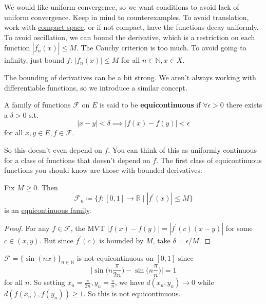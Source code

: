   We would like uniform convergence, so we want conditions to avoid lack of uniform convergence. Keep in mind to counterexamples. To avoid translation, work with \hyperref[pst-def:compact-space]{compact space}, or if not compact, have the functions decay uniformly. To avoid oscillation, we can bound the derivative, which is a restriction on each function $|f_n^\prime (x)| \leq M$. The Cauchy criterion is too much. To avoid going to infinity, just bound $f$: $|f_n (x)| \leq M$ for all $n \in \mathbb{N}, x \in X$. 

  The bounding of derivatives can be a bit strong. We aren't always working with differentiable functions, so we introduce a similar concept. 

  \begin{definition}
    \label{def:equicontinuous-family}
    A family of functions $\mathcal{F}$ on $E$ is said to be \textbf{equicontinuous} if $\forall \epsilon > 0$ there exists a $\delta > 0$ s.t. 
    \begin{equation}
      |x - y| < \delta \implies |f(x) - f(y)| < \epsilon
    \end{equation}
    for all $x, y \in E, f \in \mathcal{F}$. 
  \end{definition}

  So this doesn't even depend on $f$. You can think of this as uniformly continuous for a class of functions that doesn't depend on $f$. The first class of equicontinuous functions you should know are those with bounded derivatives. 

  \begin{lemma}
    \label{thm:functions-with-bounded-derivatives-are}
    Fix $M \geq 0$. Then 
    \begin{equation}
      \mathcal{F}_n \coloneqq \{f : [0, 1] \to \mathbb{R} \mid |f^\prime (x)| \leq M \} 
    \end{equation}
    is an \hyperref[def:equicontinuous-family]{equicontinuous family}. 
  \end{lemma}
  \begin{proof}
    For any $f \in \mathcal{F}$, the MVT $|f(x) - f(y)| = |f^\prime (c) (x - y)|$ for some $c \in (x, y)$. But since $f^\prime (c)$ is bounded by $M$, take $\delta = \epsilon/M$. 
  \end{proof}

  \begin{example}
    \label{ex:not-equicontinuous-since-setting-while}
    $\mathcal{F} = \{\sin(nx)\}_{n \in \mathbb{N}}$ is not equicontinuous on $[0, 1]$ since 
    \begin{equation}
      \bigg| \sin\Big( n \frac{\pi}{2n} \Big) - \sin \Big( n \frac{\pi}{n} \Big) \bigg| = 1
    \end{equation}
    for all $n$. So setting $x_n = \frac{\pi}{2n}, y_n = \frac{\pi}{n}$, we have $d(x_n, y_n) \to 0$ while $d(f(x_n), f(y_n)) \geq 1$. So this is not equicontinuous. 
  \end{example} 

